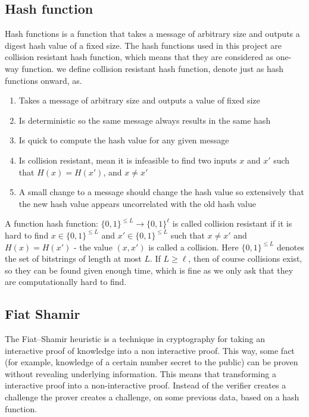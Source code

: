 \subsection{Hash function} \label{sec:hash_function}
Hash functions is a function that takes a message of arbitrary size and outputs a digest hash value of a fixed size. The hash functions used in this project are collision resistant hash function, which means that they are considered as one-way function. we define collision resistant hash function, denote just as hash functions onward, as.

\begin{defi}
\begin{enumerate}
    \item Takes a message of arbitrary size and outputs a value of fixed size
    \item Is deterministic so the same message always results in the same hash
    \item Is quick to compute the hash value for any given message
    \item Is collision resistant, mean it is infeasible to find two inputs $x$ and $x'$ such that $H(x) = H(x')$, and $x \neq x'$
    \item A small change to a message should change the hash value so extensively that the new hash value appears uncorrelated with the old hash value
\end{enumerate}
\end{defi}

A function hash function: $\{0,1\}^{\leq L} \rightarrow \{0,1\}^\ell$ is called collision resistant if it is hard to find $x \in \{0,1\}^{\leq L}$ and $x' \in \{0,1\}^{\leq L}$ such that $x \neq x'$ and $H(x)=H(x')$ - the value $(x,x')$ is called a collision. Here $\{0,1\}^{\leq L}$ denotes the set of bitstrings of length at most $L$. If $L \geq \ell$, then of course collisions exist, so they can be found given enough time, which is fine as we only ask that they are computationally hard to find.  

\subsection{Fiat Shamir} \label{sec:fiat_shamir}
The Fiat–Shamir heuristic is a technique in cryptography for taking an interactive proof of knowledge into a non interactive proof. This way, some fact (for example, knowledge of a certain number secret to the public) can be proven without revealing underlying information. This means that transforming a interactive proof into a non-interactive proof. Instead of the verifier creates a challenge the prover creates a challenge, on some previous data, based on a hash function.

